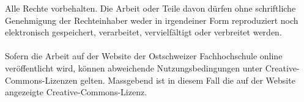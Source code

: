 \mbox{}
\vfill

\noindent\makebox[\linewidth]{\rule{\textwidth}{1pt}}
\begin{flushleft}
    \begin{small}
        Alle Rechte vorbehalten. Die Arbeit oder Teile davon dürfen ohne schriftliche Genehmigung der Rechteinhaber weder in irgendeiner Form reproduziert noch elektronisch gespeichert, verarbeitet, vervielfältigt oder verbreitet werden.\\~\\
        Sofern die Arbeit auf der Website der Ostschweizer Fachhochschule online veröffentlicht wird, können abweichende Nutzungsbedingungen unter Creative-Commons-Lizenzen gelten. Massgebend ist in diesem Fall die auf der Website angezeigte Creative-Commons-Lizenz.
    \end{small}
\end{flushleft}

\pagebreak
